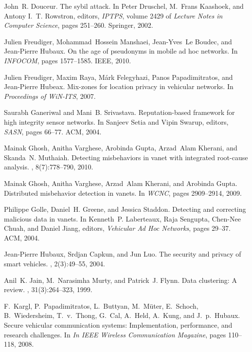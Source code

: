 \documentclass[conference]{IEEEtran}[10pt]
\begin{document}
\begin{thebibliography}{10}
John~R. Douceur.
\newblock The sybil attack.
\newblock In Peter Druschel, M.~Frans Kaashoek, and Antony I.~T. Rowstron,
  editors, {\em IPTPS}, volume 2429 of {\em Lecture Notes in Computer Science},
  pages 251--260. Springer, 2002.

Julien Freudiger, Mohammad~Hossein Manshaei, Jean-Yves~Le Boudec, and
  Jean-Pierre Hubaux.
\newblock On the age of pseudonyms in mobile ad hoc networks.
\newblock In {\em INFOCOM}, pages 1577--1585. IEEE, 2010.

Julien Freudiger, Maxim Raya, Márk Felegyhazi, Panos Papadimitratos, and
  Jean-Pierre Hubeax.
\newblock Mix-zones for location privacy in vehicular networks.
\newblock In {\em Proceedings of WiN-ITS}, 2007.

Saurabh Ganeriwal and Mani~B. Srivastava.
\newblock Reputation-based framework for high integrity sensor networks.
\newblock In Sanjeev Setia and Vipin Swarup, editors, {\em SASN}, pages 66--77.
  ACM, 2004.

Mainak Ghosh, Anitha Varghese, Arobinda Gupta, Arzad~Alam Kherani, and
  Skanda~N. Muthaiah.
\newblock Detecting misbehaviors in vanet with integrated root-cause analysis.
, 8(7):778--790, 2010.

Mainak Ghosh, Anitha Varghese, Arzad~Alam Kherani, and Arobinda Gupta.
\newblock Distributed misbehavior detection in vanets.
\newblock In {\em WCNC}, pages 2909--2914, 2009.

Philippe Golle, Daniel~H. Greene, and Jessica Staddon.
\newblock Detecting and correcting malicious data in vanets.
\newblock In Kenneth~P. Laberteaux, Raja Sengupta, Chen-Nee Chuah, and Daniel
  Jiang, editors, {\em Vehicular Ad Hoc Networks}, pages 29--37. ACM, 2004.

Jean-Pierre Hubaux, Srdjan Capkun, and Jun Luo.
\newblock The security and privacy of smart vehicles.
, 2(3):49--55, 2004.

Anil~K. Jain, M.~Narasimha Murty, and Patrick~J. Flynn.
\newblock Data clustering: A review.
, 31(3):264--323, 1999.

F.~Kargl, P.~Papadimitratos, L.~Buttyan, M.~Müter, E.~Schoch, B.~Wiedersheim,
  T.~v.~Thong, G.~Cal, A.~Held, A.~Kung, and J.~p.~Hubaux.
\newblock Secure vehicular communication systems: Implementation, performance,
  and research challenges.
\newblock In {\em In IEEE Wireless Communication Magazine}, pages 110--118,
  2008.


\end{thebibliography}
\end{document}
